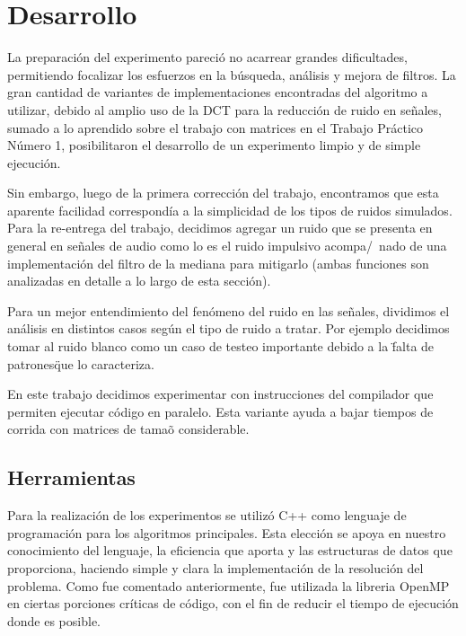 
\section{Desarrollo}

La preparaci\'on del experimento pareci\'o no acarrear grandes dificultades, permitiendo
focalizar los esfuerzos en la b\'usqueda, an\'alisis y mejora de filtros. 
La gran cantidad de variantes de implementaciones encontradas del algoritmo a 
utilizar, debido al amplio uso de la DCT para la reducci\'on de ruido en se\~nales, 
sumado a lo aprendido sobre el trabajo con matrices en el Trabajo Pr\'actico 
N\'umero 1, posibilitaron el desarrollo de un experimento limpio y de simple 
ejecuci\'on.

Sin embargo, luego de la primera correcci\'on del trabajo, encontramos que esta
aparente facilidad correspond\'ia a la simplicidad de los tipos de ruidos simulados.
Para la re-entrega del trabajo, decidimos agregar un ruido que se presenta en general
en se\~nales de audio como lo es el ruido impulsivo acompa/~nado de una implementaci\'on
del filtro de la mediana para mitigarlo (ambas funciones son analizadas en detalle a lo 
largo de esta secci\'on).    	

Para un mejor entendimiento del fen\'omeno del ruido en las se\~nales, dividimos
el an\'alisis en distintos casos seg\'un el tipo de ruido a tratar. 
Por ejemplo decidimos tomar al ruido blanco como un caso de testeo importante 
debido a la \"falta de patrones\" que lo caracteriza. 

En este trabajo decidimos experimentar con instrucciones del compilador que
permiten ejecutar c\'odigo en paralelo. Esta variante ayuda a bajar tiempos de
corrida con matrices de tama\~o considerable.

\subsection{Herramientas}

Para la realizaci\'on de los experimentos se utiliz\'o C++ como lenguaje de
programaci\'on para los algoritmos principales. Esta elecci\'on se apoya en
nuestro conocimiento del lenguaje, la eficiencia que aporta y las estructuras de
datos que proporciona, haciendo simple y clara la implementaci\'on de la
resoluci\'on del problema. Como fue comentado anteriormente, fue utilizada la
libreria OpenMP en ciertas porciones cr\'iticas de c\'odigo, con el fin de 
reducir el tiempo de ejecuci\'on donde es posible.

